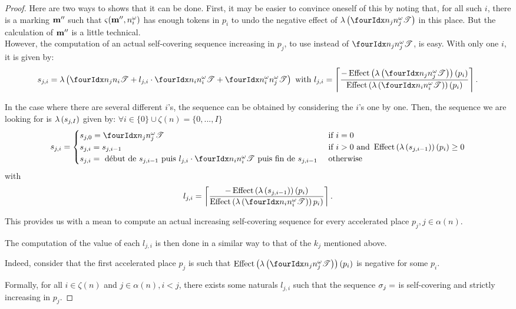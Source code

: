 \begin{proof}
  Here are two ways to shows that it can be done.
  First, it may be easier to convince oneself of this by noting that, for all such $i$, there is a marking $\mathbf{m}''$ such that $\operatorname{\varsigma}(\mathbf{m}'',n^\omega_i)$ has enough tokens in $p_i$ to undo the negative effect of $\labt{\treepath[n_j]{n^\omega_j}}$ in this place. But the calculation of $\mathbf{m}''$ is a little technical.\\
   However, the computation of an actual self-covering sequence increasing in $p_j$, to use instead of $\treepath[n_j]{ n^\omega_j}$, is easy. With only one $i$, it is given by:
   \[
     s_{j,i} = \labt{\treepath[n_j]{n_i} + l_{j,i} \cdot \treepath[n_i]{n^\omega_i} + \treepath[n^\omega_i]{n^\omega_j}}
    \text{ with } l_{j,i} =
    \left\lceil \frac{-\effect{\labt{\treepath[n_j]{n^\omega_j}}}(p_i)}
                     { \effect{\labt{\treepath[n_i]{n^\omega_i}}}(p_i)} \right\rceil \text{.}\]

                   In the case where there are several different $i$'s, the sequence can be obtained by considering the $i$'s one by one. Then, the sequence we are looking for is $\operatorname{\lambda}\left({s_{j,I}}\right)$ given by: $\forall i \in \{0\} \cup \zeta(n) = \{0, ..., I\}$
  \[
    s_{j,i} =
    \begin{cases}
      s_{j,0} = \treepath[n_j]{n^\omega_j}
        &\text{ if } i = 0 \\
      s_{j,i} = s_{j,i-1}
        &\text{ if } i > 0 \text{ and } \effect{\labt{s_{j,i-1}}}(p_i) \geq 0 \\
      s_{j,i} = \text{ début de } s_{j,i-1} \text{ puis } l_{j,i} \cdot \treepath[n_i]{n^\omega_i} \text{ puis fin de } s_{j,i-1}
        &\text{ otherwise}
    \end{cases}
  \]
  with
  \[
    l_{j,i} = 
    \left\lceil \frac{-\effect{\labt{s_{j,i-1}}}(p_i)}
                     { \effect{\labt{\treepath[n_i]{n^\omega_i}}}p_i)} \right\rceil \text{.}
  \]

  This provides us with a mean to compute an actual increasing self-covering sequence for every accelerated place $p_j, j \in \alpha(n)$.

  The computation of the value of each $l_{j,i}$ is then done in a similar way to that of the $k_j$ mentioned above.

  Indeed, consider that the first accelerated place $p_j$ is such that $\effect{\labt{\treepath[n_j]{n^\omega_j}}}(p_i)$ is negative for some $p_i$.



  Formally, for all $i \in \zeta(n)$ and $j \in \alpha(n), i < j$, there exists some naturals $l_{j,i}$ such that the sequence
  $\seqt_j = $
  is self-covering and strictly increasing in $p_j$.
 

\end{proof}
